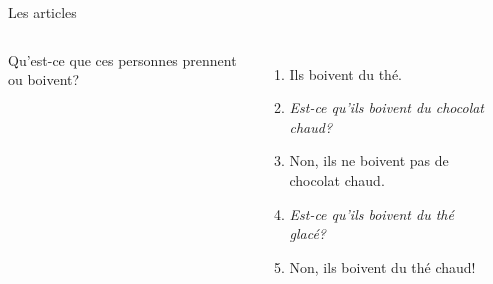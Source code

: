 \begin{frame}{Les articles}
  \begin{columns}
      Qu'est-ce que ces personnes prennent ou boivent?
      \begin{enumerate}
        \item<2-> Ils boivent du thé.
        \item<2-> \emph{Est-ce qu'ils boivent du chocolat chaud?}
        \item<3-> Non, ils ne boivent pas de chocolat chaud.
        \item<3-> \emph{Est-ce qu'ils boivent du thé glacé?}
        \item<4-> Non, ils boivent du thé chaud!
      \end{enumerate}
      \begin{minipage}[c][0.6\textwidth]{\linewidth}
        \begin{center}
        \end{center}
      \end{minipage}
  \end{columns}
\end{frame}